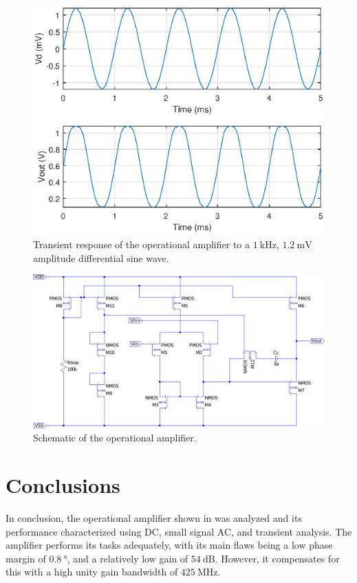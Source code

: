 \documentclass[journal,hidelinks]{IEEEtran}
\begin{document}
\begin{figure}[!htb]
  \centering
  \includegraphics[width=\columnwidth]{tran_dist_dm.eps}
  \caption{Transient response of the operational amplifier to a $\SI{1}{\kilo\hertz}$, $\SI{1.2}{\milli\volt}$ amplitude differential sine wave.}
  \label{fig:tran_dist_dm}
\end{figure}

\begin{figure}[!htb]
  \centering
  \includegraphics[width=\textwidth]{opamp.pdf}
  \caption{Schematic of the operational amplifier.}
  \label{fig:opamp}
\end{figure}

\section{Conclusions}

In conclusion, the operational amplifier shown in  was analyzed and its performance characterized using DC, small signal AC, and transient analysis. The amplifier performs its tasks adequately, with its main flaws being a low phase margin of $\SI{0.8}{\degree}$, and a relatively low gain of $\SI{54}{\deci\bel}$. However, it compensates for this with a high unity gain bandwidth of $\SI{425}{\mega\hertz}$.



\end{document}
